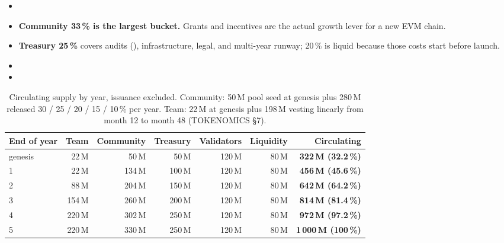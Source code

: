 \begin{itemize}
\item {}
\item \textbf{Community 33\,\% is the largest bucket.} Grants and incentives are
  the actual growth lever for a new EVM chain.
\item \textbf{Treasury 25\,\%} covers audits (), infrastructure, legal,
   and multi-year runway; 20\,\% is liquid because those costs
  start before launch.
\item {}
\item {}
\end{itemize}

\begin{table}[H]
\centering
\small
\begin{tabular}{@{}lrrrrrr@{}}
\toprule
End of year & Team & Community & Treasury & Validators & Liquidity & \textbf{Circulating} \\
\midrule
genesis & 22\,M & 50\,M & 50\,M & 120\,M & 80\,M & \textbf{322\,M (32.2\,\%)} \\
1 & 22\,M & 134\,M & 100\,M & 120\,M & 80\,M & \textbf{456\,M (45.6\,\%)} \\
2 & 88\,M & 204\,M & 150\,M & 120\,M & 80\,M & \textbf{642\,M (64.2\,\%)} \\
3 & 154\,M & 260\,M & 200\,M & 120\,M & 80\,M & \textbf{814\,M (81.4\,\%)} \\
4 & 220\,M & 302\,M & 250\,M & 120\,M & 80\,M & \textbf{972\,M (97.2\,\%)} \\
5 & 220\,M & 330\,M & 250\,M & 120\,M & 80\,M & \textbf{1\,000\,M (100\,\%)} \\
\bottomrule
\end{tabular}
\caption{Circulating supply by year, issuance excluded. Community: 50\,M pool
seed at genesis plus 280\,M released 30 / 25 / 20 / 15 / 10\,\% per year.
Team: 22\,M at genesis plus 198\,M vesting linearly from month 12 to month 48
(TOKENOMICS \S7).}
\end{table}

